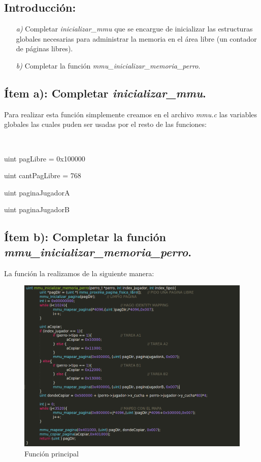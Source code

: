 \subsection{Introducción:}

\begin{itemize}
\item [\textit{a)}] Completar \textit{inicializar\_mmu} que se encargue de inicializar las estructuras globales necesarias para administrar la memoria en el área libre (un contador de páginas libres).
\item [\textit{b)}] Completar la función \textit{mmu\_inicializar\_memoria\_perro}.
\end{itemize}

\subsection{Ítem a): Completar \textit{inicializar\_mmu}.}

	Para realizar esta función simplemente creamos en el archivo \textit{mmu.c} las variables globales las cuales puden ser usadas por el resto de las funciones:	

	$~$

	uint pagLibre = 0x100000 

	uint cantPagLibre = 768 

	uint paginaJugadorA

	uint paginaJugadorB\\

\subsection{Ítem b): Completar la función \textit{mmu\_inicializar\_memoria\_perro}.}

La función la realizamos de la siguiente manera:

\begin{figure}[H]
\begin{center}
\includegraphics[width=\linewidth]{ejercicio4/funprin.png}
\caption{{\small Función principal} }
\endminipage
\end{center}
\end{figure}


